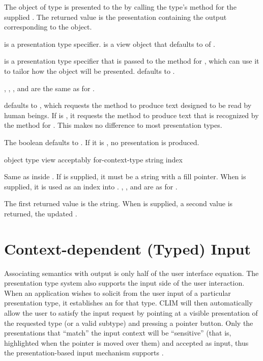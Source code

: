 The object  of type  is presented to the 
 by calling the type's  method for the supplied
 .  The returned value is the presentation containing the
output corresponding to the object.

 is a presentation type specifier.   is a view object that
defaults to  of .

 is a presentation type specifier that is passed to the
 method for , which can use it to tailor how the object
will be presented.   defaults to .

, , , and
 are the same as for .

 defaults to , which requests the  method to
produce text designed to be read by human beings.  If  is
, it requests the  method to produce text that is recognized
by the  method for .  This makes no difference
to most presentation types.

The boolean  defaults to .  If it is , no
presentation is produced.


 {object \optional type
                            \key view acceptably for-context-type string index}

Same as  inside .  If  is
supplied, it must be a string with a fill pointer.  When  is
supplied, it is used as an index into .  ,
, and  are as for .

The first returned value is the string.  When  is supplied, a second
value is returned, the updated .


\section {Context-dependent (Typed) Input}

Associating semantics with output is only half of the user interface equation.
The presentation type system also supports the input side of the user
interaction.  When an application wishes to solicit from the user input of a
particular presentation type, it establishes an  for that
type.  CLIM will then automatically allow the user to satisfy the input request
by pointing at a visible presentation of the requested type (or a valid subtype)
and pressing a pointer button.  Only the presentations that ``match'' the input
context will be ``sensitive'' (that is, highlighted when the pointer is moved
over them) and accepted as input, thus the presentation-based input mechanism
supports .

